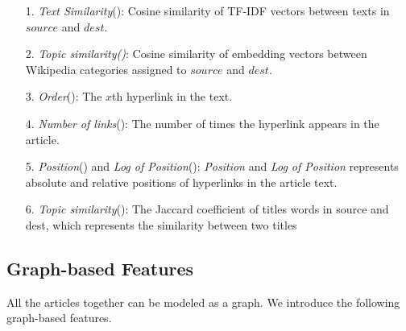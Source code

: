 \begin{itemize}

    \item[1.] \emph{Text Similarity}(\cite{thruesen2016link, dimitrov2017makes}): Cosine similarity of TF-IDF vectors between texts in $source$ and $dest$.

    \item[2.] \emph{Topic similarity(\cite{dimitrov2017makes})}: Cosine similarity of embedding vectors between Wikipedia categories assigned to $source$ and $dest$.

    \item[3.] \emph{Order}(\cite{thruesen2016link}): The $x$th hyperlink in the text.

    \item[4.] \emph{Number of links}(\cite{thruesen2016link}): The number of times the hyperlink appears in the article. 

    \item[5.] \emph{Position}(\cite{thruesen2016link}) and \emph{Log of Position}(\cite{thruesen2016link}): \emph{Position} and \emph{Log of Position} represents absolute and relative positions of hyperlinks in the article text.

    \item[6.] \emph{Topic similarity}(\cite{thruesen2016link}): The Jaccard coefficient of titles words in
    source and dest, which represents the similarity between two titles

\end{itemize}

\subsection{Graph-based Features}

All the articles together can be modeled as a graph. We introduce the following graph-based features.


